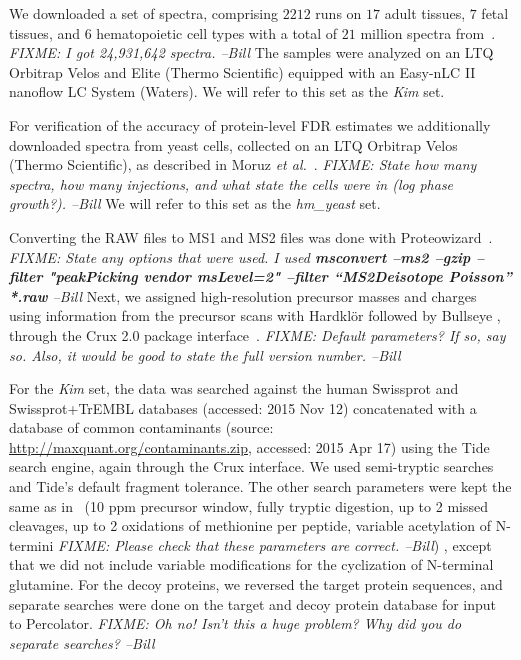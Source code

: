 \documentclass{article}
\begin{document}
We downloaded a set of spectra, comprising $2212$ runs on $17$ adult
tissues, $7$ fetal tissues, and $6$ hematopoietic cell types with a
total of $21$ million spectra from~\cite{kim2014draft}. {\em FIXME: I
  got 24,931,642 spectra. --Bill} The
samples were analyzed on an LTQ Orbitrap Velos and Elite
(Thermo Scientific) equipped with an Easy-nLC II nanoflow LC System
(Waters). We will refer to this set as the {\em Kim} set.

For verification of the accuracy of protein-level FDR estimates we
additionally downloaded spectra from yeast cells, collected on an LTQ
Orbitrap Velos (Thermo Scientific), as described in Moruz {\em et
  al.}~\cite{moruz2013}. {\em FIXME: State how many spectra, how many
  injections, and what state the cells were in (log phase
  growth?). --Bill} We will refer to this set as the {\em hm\_yeast}
set.

Converting the RAW files to MS1 and MS2 files was done with
Proteowizard~\cite{kessner2008}. {\em FIXME: State any options that
  were used.  I used {\bf msconvert --ms2 --gzip --filter "peakPicking
    vendor msLevel=2" --filter ``MS2Deisotope Poisson'' *.raw} --Bill} Next, we assigned high-resolution
precursor masses and charges using information from the precursor
scans with Hardkl\"{o}r \cite{hoopmann2007} followed by Bullseye
\cite{hsieh2009}, through the Crux 2.0 package
interface~\cite{mcilwain2014}.  {\em FIXME: Default parameters?  If
  so, say so.  Also, it would be good to state the full version
  number. --Bill}

For the {\em Kim} set, the data was searched against the human
Swissprot and Swissprot+TrEMBL databases (accessed: 2015 Nov 12)
concatenated with a database of common contaminants (source:
\url{http://maxquant.org/contaminants.zip}, accessed: 2015 Apr 17)
using the Tide search engine, again through the Crux interface. We
used semi-tryptic searches and Tide's default fragment tolerance. The
other search parameters were kept the same as in~\cite{kim2014draft}
(10 ppm precursor window, fully tryptic digestion, up to 2 missed
cleavages, up to 2 oxidations of methionine per peptide, variable
acetylation of N-termini {\em FIXME: Please check that these
  parameters are correct. --Bill}) , except that we did not include
variable modifications for the cyclization of N-terminal glutamine.
For the decoy proteins, we reversed the target protein sequences, and
separate searches were done on the target and decoy protein database
for input to Percolator. {\em FIXME: Oh no!  Isn't this a huge
  problem?  Why did you do separate searches? --Bill}
\end{document}
